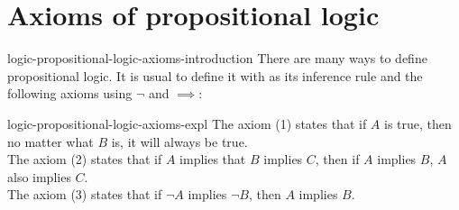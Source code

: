 \documentclass[preview]{standalone}
\begin{document}
\genpage

\section{Axioms of propositional logic}

\begin{snippet}{logic-propositional-logic-axioms-introduction}
There are many ways to define propositional logic.
It is usual to define it with  as its inference rule
and the following axioms using \(\lnot\) and \(\implies\):
\end{snippet}


\begin{snippet}{logic-propositional-logic-axioms-expl}
The axiom (1) states that if \(A\) is true, then no matter what \(B\) is, it will always be true.
\\
The axiom (2) states that if \(A\) implies that \(B\) implies \(C\), then if \(A\) implies \(B\),
\(A\) also implies \(C\).
\\
The axiom (3) states that if \(\lnot A\) implies \(\lnot B\), then \(A\) implies \(B\).
\end{snippet}
\end{document}
